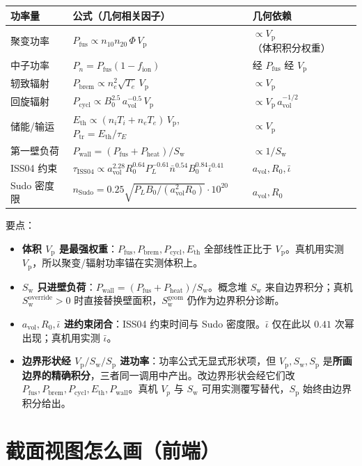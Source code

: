 \documentclass[UTF8,11pt]{ctexart}
\newcommand{\Vp}{V_\mathrm{p}}
\newcommand{\Sw}{S_\mathrm{w}}
\newcommand{\Sp}{S_\mathrm{p}}
\newcommand{\Pfus}{P_\mathrm{fus}}
\newcommand{\Pbrem}{P_\mathrm{brem}}
\newcommand{\Pcycl}{P_\mathrm{cycl}}
\newcommand{\Pheat}{P_\mathrm{heat}}
\newcommand{\Pwall}{P_\mathrm{wall}}
\newcommand{\Eth}{E_\mathrm{th}}
\newcommand{\iotabar}{\bar{\iota}}
\begin{document}
\begin{center}
\renewcommand{\arraystretch}{1.35}
\begin{tabular}{@{}lll@{}}
\toprule
功率量 & 公式（几何相关因子）& 几何依赖 \\
\midrule
聚变功率 & $\Pfus \propto n_{10}n_{20}\,\Phi\,\Vp$ & $\propto \Vp$（体积积分权重）\\
中子功率 & $P_n=\Pfus(1-f_\mathrm{ion})$ & 经 $\Pfus$ 经 $\Vp$ \\
轫致辐射 & $\Pbrem \propto n_e^2\sqrt{T_e}\,\Vp$ & $\propto \Vp$ \\
回旋辐射 & $\Pcycl \propto B_0^{2.5}\,a_\mathrm{vol}^{-0.5}\,\Vp$ & $\propto \Vp\,a_\mathrm{vol}^{-1/2}$ \\
储能/输运 & $\Eth \propto (n_iT_i+n_eT_e)\,\Vp$,\ \ $P_\mathrm{tr}=\Eth/\tau_E$ & $\propto \Vp$ \\
第一壁负荷 & $\Pwall = (\Pfus+\Pheat)/\Sw$ & $\propto 1/\Sw$ \\
ISS04 约束 & $\tau_\mathrm{ISS04}\propto a_\mathrm{vol}^{2.28}R_0^{0.64}P_L^{-0.61}\bar{n}^{0.54}B_0^{0.84}\iotabar^{0.41}$ & $a_\mathrm{vol},R_0,\iotabar$ \\
Sudo 密度限 & $n_\mathrm{Sudo}=0.25\sqrt{P_L B_0/(a_\mathrm{vol}^2R_0)}\cdot10^{20}$ & $a_\mathrm{vol},R_0$ \\
\bottomrule
\end{tabular}
\end{center}

要点：
\begin{itemize}
\item \textbf{体积 $\Vp$ 是最强权重}：$\Pfus,\Pbrem,\Pcycl,\Eth$ 全部线性正比于 $\Vp$。真机用实测 $\Vp$，所以聚变/辐射功率锚在实测体积上。
\item \textbf{$\Sw$ 只进壁负荷}：$\Pwall=(\Pfus+\Pheat)/\Sw$。概念堆 $\Sw$ 来自边界积分；真机 $\Sw^\mathrm{override}>0$ 时直接替换壁面积，$\Sw^{\mathrm{geom}}$ 仍作为边界积分诊断。
\item \textbf{$a_\mathrm{vol},R_0,\iotabar$ 进约束闭合}：ISS04 约束时间与 Sudo 密度限。$\iotabar$ 仅在此以 $0.41$ 次幂出现；真机用实测 $\iotabar$。
\item \textbf{边界形状经 $\Vp/\Sw/\Sp$ 进功率}：功率公式无显式形状项，但 $\Vp,\Sw,\Sp$ 是\textbf{所画边界的精确积分}，三者同一调用中产出。改边界形状会经它们改 $\Pfus,\Pbrem,\Pcycl,\Eth,\Pwall$。真机 $V_p$ 与 $\Sw$ 可用实测覆写替代，$\Sp$ 始终由边界积分给出。
\end{itemize}

\section{截面视图怎么画（前端）}\label{sec:view}
\end{document}

